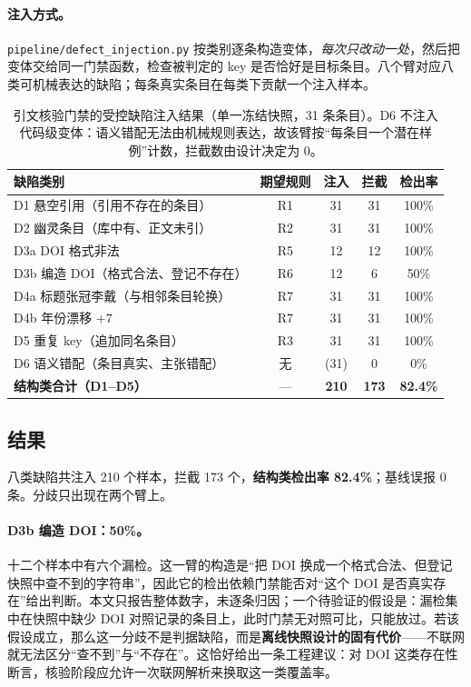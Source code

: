 \paragraph{注入方式。}\texttt{pipeline/defect\_injection.py} 按类别逐条构造变体，\emph{每次只改动一处}，然后把变体交给同一门禁函数，检查被判定的 key 是否恰好是目标条目。八个臂对应八类可机械表达的缺陷；每条真实条目在每类下贡献一个注入样本。

\begin{table}[t]
\centering
\small
\caption{引文核验门禁的受控缺陷注入结果（单一冻结快照，31 条条目）。D6 不注入代码级变体：语义错配无法由机械规则表达，故该臂按“每条目一个潜在样例”计数，拦截数由设计决定为 0。}
\label{tab:injection}
\begin{tabularx}{\textwidth}{@{}X c c c c@{}}
\toprule
\textbf{缺陷类别} & \textbf{期望规则} & \textbf{注入} & \textbf{拦截} & \textbf{检出率} \\
\midrule
D1 悬空引用（引用不存在的条目） & R1 & 31 & 31 & 100\% \\
D2 幽灵条目（库中有、正文未引） & R2 & 31 & 31 & 100\% \\
D3a DOI 格式非法 & R5 & 12 & 12 & 100\% \\
D3b 编造 DOI（格式合法、登记不存在） & R6 & 12 & 6 & 50\% \\
D4a 标题张冠李戴（与相邻条目轮换） & R7 & 31 & 31 & 100\% \\
D4b 年份漂移 $+7$ & R7 & 31 & 31 & 100\% \\
D5 重复 key（追加同名条目） & R3 & 31 & 31 & 100\% \\
D6 语义错配（条目真实、主张错配） & 无 & (31) & 0 & 0\% \\
\midrule
\textbf{结构类合计（D1--D5）} & --- & \textbf{210} & \textbf{173} & \textbf{82.4\%} \\
\bottomrule
\end{tabularx}
\end{table}

\subsection{结果}

八类缺陷共注入 210 个样本，拦截 173 个，\textbf{结构类检出率 82.4\%}；基线误报 0 条。分歧只出现在两个臂上。

\paragraph{D3b 编造 DOI：50\%。}十二个样本中有六个漏检。这一臂的构造是“把 DOI 换成一个格式合法、但登记快照中查不到的字符串”，因此它的检出依赖门禁能否对“这个 DOI 是否真实存在”给出判断。本文只报告整体数字，未逐条归因；一个待验证的假设是：漏检集中在快照中缺少 DOI 对照记录的条目上，此时门禁无对照可比，只能放过。若该假设成立，那么这一分歧不是判据缺陷，而是\textbf{离线快照设计的固有代价}——不联网就无法区分“查不到”与“不存在”。这恰好给出一条工程建议：对 DOI 这类存在性断言，核验阶段应允许一次联网解析来换取这一类覆盖率。


